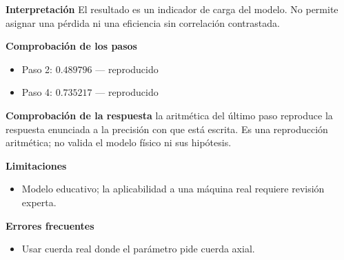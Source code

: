 \documentclass[10pt,openany]{book}
\begin{document}
\begin{tcolorbox}[title={Problema resuelto 4}, studiumworked, breakable]
\noindent\textbf{Interpretación}
El resultado es un indicador de carga del modelo. No permite asignar una pérdida ni una eficiencia sin correlación contrastada.

\noindent\textbf{Comprobación de los pasos}
\begin{itemize}
\item Paso 2: $0.489796$ — reproducido
\item Paso 4: $0.735217$ — reproducido
\end{itemize}

\noindent\textbf{Comprobación de la respuesta} la aritmética del último paso reproduce la respuesta enunciada a la precisión con que está escrita. Es una reproducción aritmética; no valida el modelo físico ni sus hipótesis.

\noindent\textbf{Limitaciones}
\begin{itemize}
\item Modelo educativo; la aplicabilidad a una máquina real requiere revisión experta.
\end{itemize}

\noindent\textbf{Errores frecuentes}
\begin{itemize}
\item Usar cuerda real donde el parámetro pide cuerda axial.
\end{itemize}
\end{tcolorbox}
\end{document}
